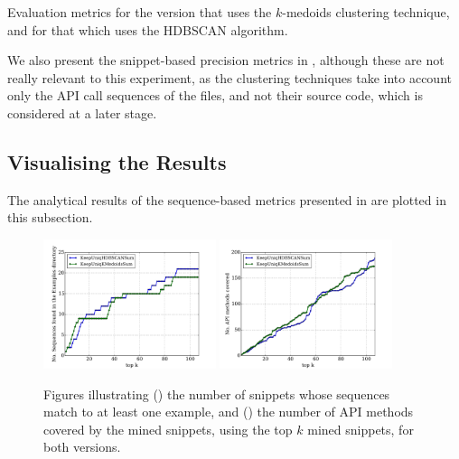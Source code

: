\begin{table}[ht]
\centering
\small
\caption[Evaluation metrics\protect\\($KeepUniqKMedoidsSum$, $KeepUniqHDBSCANSum$)]{Evaluation metrics for the version that uses the $k$-medoids clustering technique, and for that which uses the HDBSCAN algorithm.}
\label{tables:evaluation-clustering}

\end{table}

We also present the snippet-based precision metrics in , although these are not really relevant to this experiment, as the clustering techniques take into account only the API call sequences of the files, and not their source code, which is considered at a later stage.


\subsection{Visualising the Results}
\label{subsec:evaluation-exp3-plots}

The analytical results of the sequence-based metrics presented in  are plotted in this subsection.

\begin{figure}[t]
\ffigbox
{%
  \begin{subfloatrow}[2]
  \ffigbox[\FBwidth]
    {\caption{}\label{res:exp3-calls-precision}}
    {\includegraphics[width=0.45\textwidth]{results/exp3-calls-precision.pdf}}
  \hspace{1em}%
  \ffigbox[\FBwidth]
    {\caption{}\label{res:exp3-coverage}}
    {\includegraphics[width=0.45\textwidth]{results/exp3-coverage.pdf}}
  \end{subfloatrow}}
  {\caption[Illustration of the precision and coverage\protect\\($KeepUniqKMedoidsSum$, $KeepUniqHDBSCANSum$)]{Figures illustrating () the number of snippets whose sequences match to at least one example, and () the number of API methods covered by the mined snippets, using the top $k$ mined snippets, for both versions.}
\label{res:exp3-calls-prec-coverage}}
\end{figure}

